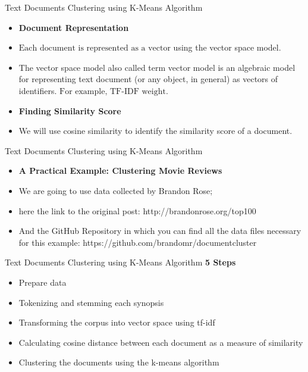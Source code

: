\documentclass[11pt]{beamer}
\newcommand{\highlight}[1]{%
  \colorbox{yellow!100}{$\displaystyle#1$}}
\begin{document}
\begin{frame}{Text Documents Clustering using K-Means Algorithm}
	\begin{itemize}
		\item \textbf{Document Representation}
		\item \highlight{\text{Each document is represented as a vector}} using the vector space model. 
		\item The vector space model also called term vector model is an algebraic model for representing text document (or any object, in general) as vectors of identifiers. \highlight{\text{For example, TF-IDF weight}}.
		\item \textbf{Finding Similarity Score}
		\item We will use cosine similarity to identify the similarity score of a document. 
	\end{itemize}
\end{frame}
\begin{frame}{Text Documents Clustering using K-Means Algorithm}
	\begin{itemize}
		\item \textbf{A Practical Example: Clustering Movie Reviews}
		\item We are going to use data collected by Brandon Rose; 
		\item here the link to the original post: http://brandonrose.org/top100
		\item And the GitHub Repository in which you can find all the data files necessary for this example: https://github.com/brandomr/document\textunderscore cluster
	\end{itemize}
\end{frame}
\begin{frame}{Text Documents Clustering using K-Means Algorithm}
	\textbf{5 Steps}
	\begin{itemize}
		\item Prepare data
		\item Tokenizing and stemming each synopsis
		\item Transforming the corpus into vector space using tf-idf
		\item Calculating cosine distance between each document as a measure of similarity
		\item Clustering the documents using the k-means algorithm
	\end{itemize}
\end{frame}
\end{document}
